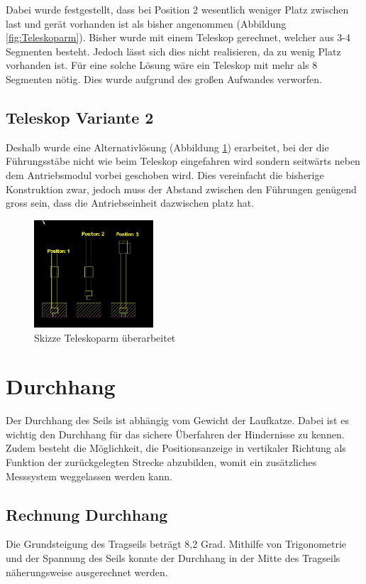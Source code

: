 \documentclass[a4paper]{report}
\begin{document}
Dabei wurde festgestellt, dass bei Position 2 wesentlich weniger Platz zwischen last und gerät vorhanden ist als bisher angenommen (Abbildung \ref{fig:Teleskoparm}). Bisher wurde mit einem Teleskop gerechnet, welcher aus 3-4 Segmenten besteht. Jedoch lässt sich dies nicht realisieren, da zu wenig Platz vorhanden ist. Für eine solche Lösung wäre ein Teleskop mit mehr als 8 Segmenten nötig. Dies wurde aufgrund des großen Aufwandes verworfen.

\subsection{Teleskop Variante 2}
\label{app:ssec:Teleskopje2}
Deshalb wurde eine Alternativlösung (Abbildung \ref{fig:Linearaufzug}) erarbeitet, bei der die Führungsstäbe nicht wie beim Teleskop eingefahren wird sondern seitwärts neben dem Antriebsmodul vorbei geschoben wird. Dies vereinfacht die bisherige Konstruktion zwar, jedoch muss der Abstand zwischen den Führungen genügend gross sein, dass die Antriebseinheit dazwischen platz hat.

\begin{figure}[h]
	\centering
	\includegraphics[keepaspectratio,height=4cm]{Teleskoparm3.JPG}
	\caption{Skizze Teleskoparm überarbeitet}
	\label{fig:Linearaufzug}
\end{figure}


\section{Durchhang}
\label{app:sec:Durchhang}
Der Durchhang des Seils ist abhängig vom Gewicht der Laufkatze. Dabei ist es wichtig den Durchhang für das sichere Überfahren der Hindernisse zu kennen. Zudem besteht die Möglichkeit, die Positionsanzeige in vertikaler Richtung als Funktion der zurückgelegten Strecke abzubilden, womit ein zusätzliches Messsystem weggelassen werden kann.

\subsection{Rechnung Durchhang}
\label{ssec:RechDurch}
Die Grundsteigung des Tragseils beträgt 8,2 Grad. Mithilfe von Trigonometrie und der Spannung des Seils konnte der Durchhang in der Mitte des Tragseils näherungsweise ausgerechnet werden.
\end{document}
